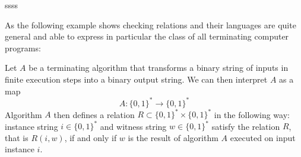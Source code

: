 \begin{example}
ssss
\end{example}

As the following example shows checking relations and their languages are quite general and able to express in particular the class of all terminating computer programs:
\begin{example} Let $A$ be a terminating algorithm that transforms a binary string of inputs in finite execution steps into a binary output string. We can then interpret $A$ as a map 
$$
A :\{0,1\}^* \to \{0,1\}^*
$$
Algorithm $A$ then defines a relation
$R\subset \{0,1\}^* \times \{0,1\}^*$ in the following way: instance string $i\in \{0,1\}^*$ and witness string $w\in \{0,1\}^*$ satisfy the relation $R$, that is $R(i,w)$, if and only if $w$ is the result of algorithm $A$ executed on input instance $i$.
\end{example}

